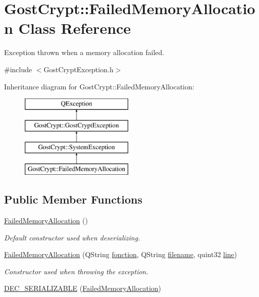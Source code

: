 \hypertarget{class_gost_crypt_1_1_failed_memory_allocation}{}\section{Gost\+Crypt\+:\+:Failed\+Memory\+Allocation Class Reference}
\label{class_gost_crypt_1_1_failed_memory_allocation}


Exception thrown when a memory allocation failed.  




{\ttfamily \#include $<$Gost\+Crypt\+Exception.\+h$>$}

Inheritance diagram for Gost\+Crypt\+:\+:Failed\+Memory\+Allocation\+:\begin{figure}[H]
\begin{center}
\leavevmode
\includegraphics[height=4.000000cm]{class_gost_crypt_1_1_failed_memory_allocation}
\end{center}
\end{figure}
\subsection*{Public Member Functions}
\begin{DoxyCompactItemize}
\item 
\hyperlink{class_gost_crypt_1_1_failed_memory_allocation_af79f263150931767bc5a28fa578ab619}{Failed\+Memory\+Allocation} ()
\begin{DoxyCompactList}\small\item\em Default constructor used when deserializing. \end{DoxyCompactList}\item 
\hyperlink{class_gost_crypt_1_1_failed_memory_allocation_a17bfa0f54495b07e265986171a4acd5f}{Failed\+Memory\+Allocation} (Q\+String \hyperlink{class_gost_crypt_1_1_gost_crypt_exception_a29b8c93d5efbb1ff369107385725a939}{fonction}, Q\+String \hyperlink{class_gost_crypt_1_1_gost_crypt_exception_a749a12375f4ba9d502623b99d8252f38}{filename}, quint32 \hyperlink{class_gost_crypt_1_1_gost_crypt_exception_abf506d911f12a4e969eea500f90bd32c}{line})
\begin{DoxyCompactList}\small\item\em Constructor used when throwing the exception. \end{DoxyCompactList}\item 
\hyperlink{class_gost_crypt_1_1_failed_memory_allocation_a58da2e04bdd4035602c895b8eb954710}{D\+E\+C\+\_\+\+S\+E\+R\+I\+A\+L\+I\+Z\+A\+B\+LE} (\hyperlink{class_gost_crypt_1_1_failed_memory_allocation}{Failed\+Memory\+Allocation})
\end{DoxyCompactItemize}

